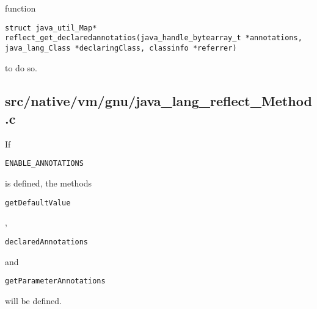 \documentclass[a4paper, 10pt, titlepage]{scrartcl} %
\begin{document}
function \begin{scriptsize}\verb|struct|\hspace{0.0pt}\verb| |\hspace{0.0pt}\verb|java_util_Map|\hspace{0.0pt}\verb|*|\hspace{0.0pt}\verb||\hspace{0.0pt}\verb| |\hspace{0.0pt}\verb|reflect_get_declaredannotatios|\hspace{0.0pt}\verb|(|\hspace{0.0pt}\verb|java_handle_bytearray_t|\hspace{0.0pt}\verb| |\hspace{0.0pt}\verb||\hspace{0.0pt}\verb|*|\hspace{0.0pt}\verb|annotations|\hspace{0.0pt}\verb|,|\hspace{0.0pt}\verb||\hspace{0.0pt}\verb| |\hspace{0.0pt}\verb|java_lang_Class|\hspace{0.0pt}\verb| |\hspace{0.0pt}\verb||\hspace{0.0pt}\verb|*|\hspace{0.0pt}\verb|declaringClass|\hspace{0.0pt}\verb|,|\hspace{0.0pt}\verb||\hspace{0.0pt}\verb| |\hspace{0.0pt}\verb|classinfo|\hspace{0.0pt}\verb| |\hspace{0.0pt}\verb||\hspace{0.0pt}\verb|*|\hspace{0.0pt}\verb|referrer|\hspace{0.0pt}\verb|)|\hspace{0.0pt}\verb||\end{scriptsize} to do so.

\subsection{src/native/vm/gnu/java\_lang\_reflect\_Method.c}
\label{sec:src/native/vm/gnu/java_lang_reflect_Method.c}

If \begin{scriptsize}\verb|ENABLE_ANNOTATIONS|\end{scriptsize} is defined, the methods \begin{scriptsize}\verb|getDefaultValue|\end{scriptsize},
\begin{scriptsize}\verb|declaredAnnotations|\end{scriptsize} and \begin{scriptsize}\verb|getParameterAnnotations|\end{scriptsize} will be
defined.
\end{document}
